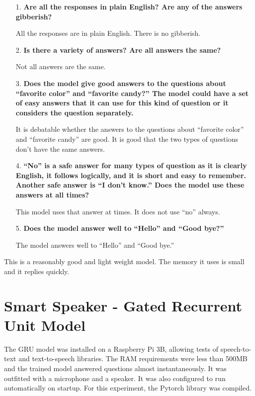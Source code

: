 \begin{itemize}
	\item [1.] \textbf{Are all the responses in plain English? Are any of the answers gibberish?}
	
	\item [] All the responses are in plain English. There is no gibberish.
	
	\item [2.] \textbf{Is there a  variety of answers? Are all answers the same?}
	
	\item [] Not all answers are the same.
	\item [3.] \textbf{Does the model give good answers to the questions about ``favorite color'' and ``favorite candy?'' The model could have a set of easy answers that it can use for this kind of question or it considers the question separately.} 
	
	\item[] It is debatable whether the answers to the questions about ``favorite color'' and ``favorite candy'' are good. It is good that the two types of questions don't have the same answers.
	
	\item [4.] \textbf{``No'' is a safe answer for many types of question as it is clearly English, it follows logically, and it is short and easy to remember. Another safe answer is ``I don't know.'' Does the model use these answers at all times?}
	
	\item[] This model uses that answer at times. It does not use ``no'' always.
	
	\item [5.] \textbf{Does the model answer well to ``Hello'' and ``Good bye?''}
	
	\item []The model answers well to ``Hello'' and ``Good bye.''
\end{itemize}

This is a reasonably good and light weight model. The memory it uses is small and it replies quickly.

\section{Smart Speaker - Gated Recurrent Unit Model}

The GRU model was installed on a Raspberry Pi 3B, allowing tests of speech-to-text and text-to-speech libraries. The RAM requirements were less than 500MB and the trained model answered questions almost instantaneously. It was outfitted with a microphone and a speaker. It was also configured to run automatically on startup. For this experiment, the Pytorch library was compiled.

